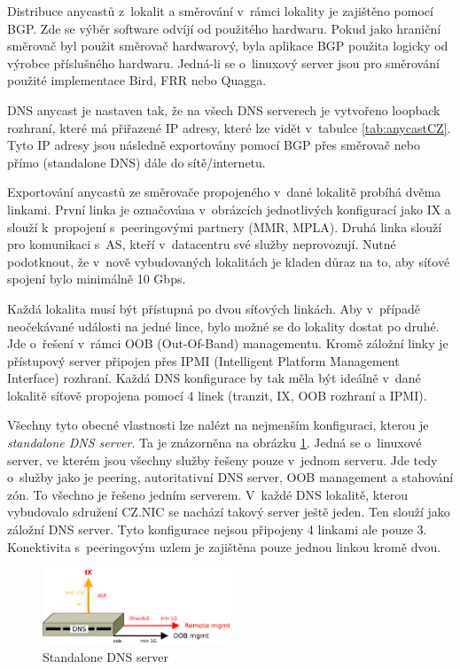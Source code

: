 \documentclass[thesis=M,czech]{src/FITthesis}[2019/12/23]
\begin{document}
Distribuce anycastů z~lokalit a směrování v~rámci lokality je zajištěno pomocí BGP. Zde se výběr software odvíjí od použitého hardwaru. Pokud jako hraniční směrovač byl použit směrovač hardwarový, byla aplikace BGP použita logicky od výrobce příslušného hardwaru. Jedná-li se o~linuxový server jsou pro směrování použité implementace Bird, FRR nebo Quagga. 

DNS anycast je nastaven tak, že na všech DNS serverech je vytvořeno loopback rozhraní, které má přiřazené IP adresy, které lze vidět v~tabulce \ref{tab:anycastCZ}. Tyto IP adresy jsou následně exportovány pomocí BGP přes směrovač nebo přímo (standalone DNS) dále do sítě/internetu. 

Exportování anycastů ze směrovače propojeného v~dané lokalitě probíhá dvěma linkami. První linka je označována v~obrázcích jednotlivých konfigurací jako IX a slouží k~propojení s~peeringovými partnery (MMR, MPLA). Druhá linka slouží pro komunikaci s~AS, kteří v~datacentru své služby neprovozují. Nutné podotknout, že v~nově vybudovaných lokalitách je kladen důraz na to, aby síťové spojení bylo minimálně 10 Gbps.

Každá lokalita musí být přístupná po dvou síťových linkách. Aby v~případě neočekávané události na jedné lince, bylo možné se do lokality dostat po druhé. Jde o~řešení v~rámci OOB (Out-Of-Band) managementu. Kromě záložní linky je přístupový server připojen přes IPMI (Intelligent Platform Management Interface) rozhraní. Každá DNS konfigurace by tak měla být ideálně v~dané lokalitě síťově propojena pomocí 4 linek (tranzit, IX, OOB rozhraní a IPMI). 
 

Všechny tyto obecné vlastnosti lze nalézt na nejmenším konfiguraci, kterou je \textit{standalone DNS server}. Ta je znázorněna na obrázku \ref{fig:infra-standalone}. Jedná se o~linuxové server, ve kterém jsou všechny služby řešeny pouze v~jednom serveru. Jde tedy o~služby jako je peering, autoritativní DNS server, OOB management a stahování zón. To všechno je řešeno jedním serverem. V~každé DNS lokalitě, kterou vybudovalo sdružení CZ.NIC se nachází takový server ještě jeden. Ten slouží jako záložní DNS server. Tyto konfigurace nejsou připojeny 4 linkami ale pouze 3. Konektivita s~peeringovým uzlem je zajištěna pouze jednou linkou kromě dvou. 

\begin{figure}[ht] 
  \centering
   \includegraphics[width=0.5\textwidth]{images/infrastructure-standalone.pdf}
   \caption{Standalone DNS server}
     \label{fig:infra-standalone}
\end{figure}
\end{document}
